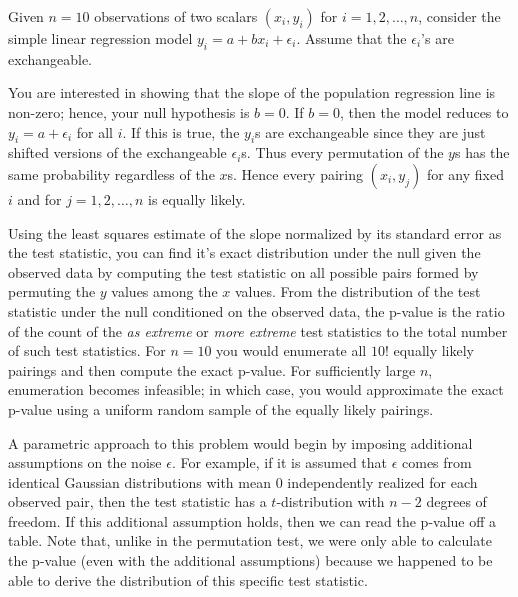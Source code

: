 \begin{example} Given $n=10$ observations of two scalars $(x_i, y_i)$ for
$i = 1, 2, \dots, n$, consider the simple linear regression model
$y_i = a + bx_i + \epsilon_i$.  Assume that the $\epsilon_i$'s are
exchangeable.

You are interested in showing that the slope of the population regression line
is non-zero; hence, your null hypothesis is $b = 0$. If $b = 0$, then the model
reduces to $y_i = a + \epsilon_i$ for all $i$.  If this is true, the
$y_i$s are exchangeable since they are just shifted versions of the
exchangeable $\epsilon_i$s.  Thus every permutation of the $y$s has the same
probability regardless of the $x$s.  Hence every pairing
$(x_i, y_j)$ for any fixed $i$ and for $j = 1, 2, \dots, n$ is equally likely.

Using the least squares estimate of the slope normalized by its standard error
as the test statistic, you can find it's exact distribution under the null given
the observed data by computing the test statistic on all possible pairs
formed by permuting the $y$ values among the $x$ values.  From the distribution
of the test statistic under the null conditioned on the observed data, the
p-value is the ratio of the count of the \emph{as extreme} or \emph{more
extreme} test statistics to the total number of such test statistics. For
$n=10$ you would enumerate all $10!$ equally likely pairings and then compute
the exact p-value.  For sufficiently large $n$, enumeration becomes infeasible;
in which case, you would approximate the exact p-value using a uniform random
sample of the equally likely pairings.

A parametric approach to this problem would begin by imposing additional
assumptions on the noise $\epsilon$.  For example, if it is assumed that
$\epsilon$ comes from identical Gaussian distributions with mean 0
independently realized for each observed pair, then the test statistic has a
$t$-distribution with $n-2$ degrees of freedom.  If this additional assumption
holds, then we can read the p-value off a table.  Note that, unlike in the
permutation test, we were only able to calculate the p-value (even with the
additional assumptions) because we happened to be able to derive the
distribution of this specific test statistic.
\end{example}

